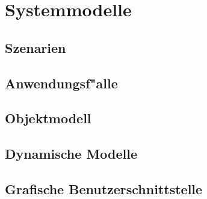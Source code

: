 \chapter{Systemmodelle}

\section{Szenarien}

\section{Anwendungsf"alle}

\section{Objektmodell}

\section{Dynamische Modelle}

\section{Grafische Benutzerschnittstelle}